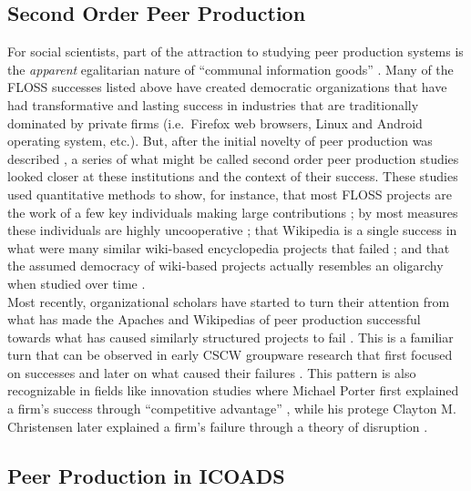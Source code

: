 \documentclass[thesis,tocnosub,noragright,centerchapter,12pt]{uiucecethesis09}
\begin{document}
\subsection*{Second Order Peer Production}
For social scientists, part of the attraction to studying peer production systems
is the \emph{apparent} egalitarian nature of ``communal information goods'' \citep[as quoted in\cite{shaw2014laboratories}]{fulk1996connective}. Many of the FLOSS successes listed above have created democratic organizations that have had transformative and
lasting success in industries that are traditionally dominated by
private firms (i.e.~Firefox web browsers, Linux and Android operating
system, etc.). But, after the initial novelty of peer production was described \citep{benkler2006wealth}, a series of what might be called second order peer production studies looked closer at these institutions and the context of their success. These studies
used quantitative methods to show, for instance, that most FLOSS projects
are the work of a few key individuals making large contributions \citep{shah2006motivation}; by most measures these individuals are highly uncooperative \citep{hill2009official}; that Wikipedia is a single success in what were
many similar wiki-based encyclopedia projects that failed  \citep{kittur2008harnessing, ortega2009wikipedia}; and that the assumed democracy of wiki-based projects actually resembles an oligarchy when studied over time \citep{shaw2014laboratories}.\\

Most recently, organizational scholars have started to turn
their attention from what has made the Apaches and Wikipedias of peer
production successful towards what has caused similarly structured
projects to fail \citep{shaw2014laboratories}. This is a familiar turn that can be observed in early CSCW groupware research that first focused on successes \citep{winograd1986language} and later on what caused their failures
\citep{grudin1988cscw}. This pattern is also recognizable in fields like
innovation studies where Michael Porter first explained a firm's success
through ``competitive advantage'' \citeyearpar{porter1987competitive}, while his protege Clayton M.
Christensen later explained a firm's failure through a theory of disruption \citeyearpar{christensen2006ongoing}.\\

\subsection*{Peer Production in ICOADS}
\end{document}
